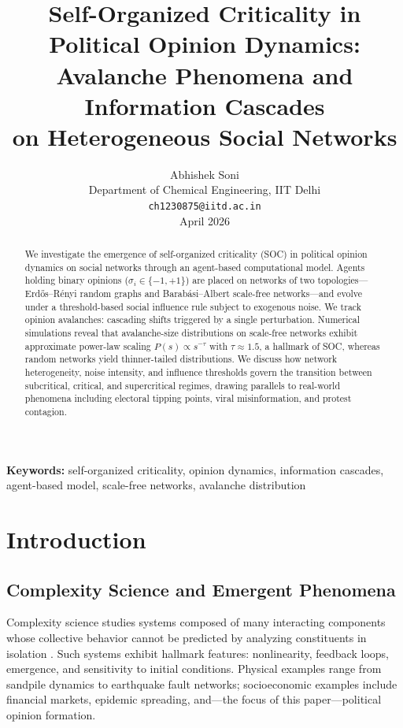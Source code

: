 \documentclass[11pt,twocolumn]{article}
\title{Self-Organized Criticality in Political Opinion Dynamics:\\
Avalanche Phenomena and Information Cascades\\
on Heterogeneous Social Networks}
\author{Abhishek Soni\\
Department of Chemical Engineering, IIT Delhi\\
\texttt{ch1230875@iitd.ac.in}\\
April 2026}
\date{}
\begin{document}
\maketitle

\begin{abstract}
We investigate the emergence of self-organized criticality (SOC) in political opinion dynamics on social networks through an agent-based computational model. Agents holding binary opinions ($\sigma_i \in \{-1, +1\}$) are placed on networks of two topologies---Erd\H{o}s--R\'enyi random graphs and Barab\'asi--Albert scale-free networks---and evolve under a threshold-based social influence rule subject to exogenous noise. We track opinion avalanches: cascading shifts triggered by a single perturbation. Numerical simulations reveal that avalanche-size distributions on scale-free networks exhibit approximate power-law scaling $P(s) \propto s^{-\tau}$ with $\tau \approx 1.5$, a hallmark of SOC, whereas random networks yield thinner-tailed distributions. We discuss how network heterogeneity, noise intensity, and influence thresholds govern the transition between subcritical, critical, and supercritical regimes, drawing parallels to real-world phenomena including electoral tipping points, viral misinformation, and protest contagion.
\end{abstract}

\noindent\textbf{Keywords:} self-organized criticality, opinion dynamics, information cascades, agent-based model, scale-free networks, avalanche distribution

\section{Introduction}

\subsection{Complexity Science and Emergent Phenomena}

Complexity science studies systems composed of many interacting components whose collective behavior cannot be predicted by analyzing constituents in isolation \citep{Bak1996}. Such systems exhibit hallmark features: nonlinearity, feedback loops, emergence, and sensitivity to initial conditions. Physical examples range from sandpile dynamics to earthquake fault networks; socioeconomic examples include financial markets, epidemic spreading, and---the focus of this paper---political opinion formation.
\end{document}
